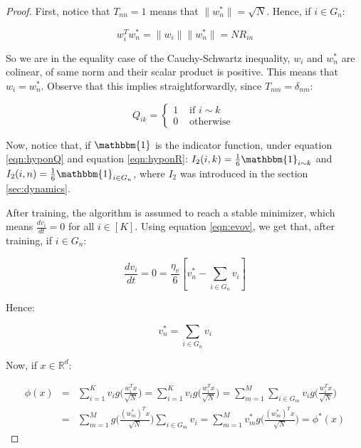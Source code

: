 \begin{proof}

    First, notice that  $T_{nn} = 1$  means that $ \lVert w_n^* \rVert = \sqrt{N}$. Hence, if $i\in G_n$:

    $$ w_i^T w_n^* = \lVert w_i \rVert \lVert w_n^* \rVert = N R_{in}$$

    So we are in the equality case of the Cauchy-Schwartz inequality, $w_i$ and $w_n^*$ are colinear, of same norm and their scalar product is positive. This means that $w_i = w_n^*$. Observe that this implies straightforwardly, since $T_{nm} = \delta_{nm}$:

    \begin{equation} \label{eqn:hyponQ}
    Q_{ik} = \begin{cases}
    1 & \text{ if } i \sim k\\
    0 & \text{ otherwise } 
    \end{cases}
    \end{equation}

    Now, notice that, if $\mathbbm{1}$ is the indicator function, under equation \ref{eqn:hyponQ} and equation \ref{eqn:hyponR}: $I_2(i,k) = \frac{1}{6} \mathbbm{1}_{i \sim k}$ and  $I_2(i,n) = \frac{1}{6} \mathbbm{1}_{i \in G_n} $, where $I_2$ was introduced in the section \ref{sec:dynamics}.

    After training, the algorithm is assumed to reach a stable minimizer, which means $\frac{dv_i}{dt} = 0$ for all $i \in [K]$. Using equation \ref{eqn:evov}, we get that, after training, if $i \in G_n$:

    \begin{equation*} 
        \dfrac{dv_i}{dt} = 0 = \dfrac{\eta_v}{6}[v_n^* - \sum \limits_{i \in G_n} v_i]
    \end{equation*}

    Hence: 

    \begin{equation}\label{eqn:stablev}
        v_n^* = \sum \limits_{i \in G_n} v_i    
    \end{equation}


    Now, if $x\in \mathbb{R}^d$:

    \begin{eqnarray*}
     \phi(x) &= &\sum \limits_{i = 1}^K v_i g\Big (\frac{w_i^Tx}{\sqrt{N}} \Big ) =\sum \limits_{i = 1}^K v_i g \Big (\frac{w_i^Tx}{\sqrt{N}} \Big ) = \sum \limits_{m = 1}^M \sum \limits_{i \in G_m} v_i g \Big (\frac{w_i^Tx}{\sqrt{N}} \Big ) \\ 
     &= &\sum \limits_{m = 1}^M g \Big (\frac{(w_m^*)^Tx}{\sqrt{N}} \Big )\sum \limits_{i \in G_m} v_i  = \sum \limits_{m = 1}^M v_m^* g \Big (\frac{(w_m^*)^Tx}{\sqrt{N}} \Big ) = \phi^*(x)
    \end{eqnarray*}    
    \end{proof}

